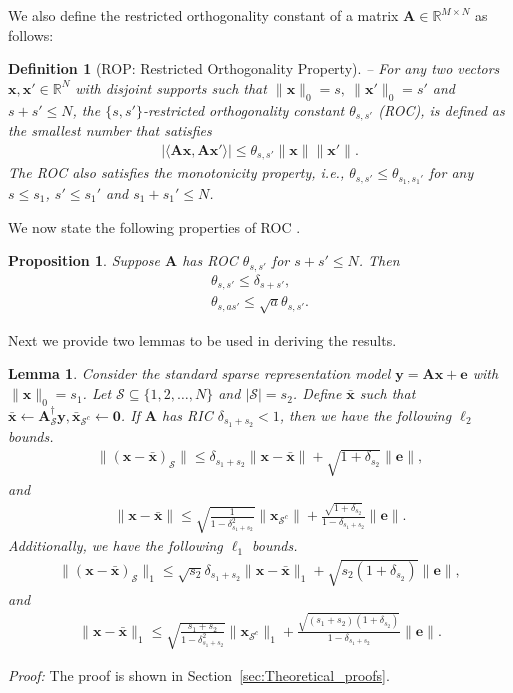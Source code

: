\documentclass[journal]{IEEEtran}
\newcommand{\mbx}{\mathbf{x}}
\newcommand{\mbA}{\mathbf{A}}
\newcommand{\mby}{\mathbf{y}}
\newcommand{\mbe}{\mathbf{e}}
\newtheorem{lemma}{Lemma}
\newtheorem{proposition}{Proposition}
\newtheorem{definition}{Definition}
\begin{document}
We also define the restricted orthogonality constant of a matrix $\mbA \in \mathbb{R}^{M \times N}$ as follows:
\begin{definition}[ROP: Restricted Orthogonality Property\cite{Cai_Shifting_Inequality_TSP_2010}]\label{def:rop} --
For any two vectors $\mbx, \mbx' \in \mathbb{R}^{N}$ with disjoint supports such that $\|\mbx\|_0 = s, \ \|\mbx'\|_0 = s'$ and $s+s' \leq N$, the $\{s,s'\}$-\textit{restricted orthogonality constant} $\theta_{s,s'}$ (ROC), is defined as the smallest number that satisfies 
\begin{align*}
|\langle \mbA\mbx, \mbA\mbx'\rangle| \leq \theta_{s,s'} \|\mbx\| \|\mbx'\|.
\end{align*}
The ROC also satisfies the monotonicity property, i.e., $\theta_{s,s'} \leq \theta_{s_1,s_1'}$ for any $s \leq s_1$, $s' \leq s_1'$ and $s_1+s_1' \leq N$.
\end{definition}
We now state the following properties of ROC \cite{Cai_Shifting_Inequality_TSP_2010}.
\begin{proposition}
Suppose $\mbA$ has ROC $\theta_{s,s'}$ for $s+s' \leq N$. Then
 \begin{subequations}
    \begin{align}
\theta_{s,s'} \leq \delta_{s+s'}, \label{prop1:1} \\
\theta_{s,as'} \leq \sqrt{a} \theta_{s,s'}. \label{prop1:2}
\end{align}
\end{subequations}
\end{proposition}
Next we provide two lemmas to be used in deriving the results.
\begin{lemma}
\label{lem:l1_l2_bound_pruning}
Consider the standard sparse representation model $\mby=\mbA\mbx + \mbe$ with $\|\mbx\|_0 = s_1$. Let $\mathcal{S} \subseteq \{1,2,\hdots,N\}$ and $|\mathcal{S}|=s_2$. Define $\bar{\mbx}$ such that $\bar{\mbx}\leftarrow \mbA_{\mathcal{S}}^\dag \mby, \bar{\mbx}_{\mathcal{S}^c} \leftarrow \mathbf{0}$. If $\mbA$ has RIC $\delta_{s_1+s_2} < 1$, then we have the following $\ell_2$ bounds.
\begin{eqnarray*}
\|\left(\mbx-\bar{\mbx}\right)_{\mathcal{S}}\| \leq \delta_{s_1+s_2} \|\mbx-\bar{\mbx}\| + \sqrt{1+\delta_{s_2}}\|\mbe\|,
\end{eqnarray*}
and
\begin{eqnarray*}
\|\mbx-\bar{\mbx}\| \leq \sqrt{\frac{1}{1-\delta_{s_1+s_2}^2}}\|\mbx_{\mathcal{S}^c}\| + \frac{\sqrt{1+\delta_{s_2}}}{1-\delta_{s_1+s_2}}\|\mbe\|.
\end{eqnarray*}
Additionally, we have the following $\ell_1$ bounds.
\begin{eqnarray*}
\|\left(\mbx-\bar{\mbx}\right)_{\mathcal{S}}\|_1 \leq \sqrt{s_2}\delta_{s_1+s_2} \|\mbx-\bar{\mbx}\|_1 + \sqrt{s_2(1+\delta_{s_2})}\|\mbe\|,
\end{eqnarray*}
and
\begin{eqnarray*}
\|\mbx-\bar{\mbx}\|_1 \leq \sqrt{\frac{s_1+s_2}{1-\delta_{s_1+s_2}^2}}\|\mbx_{\mathcal{S}^c}\|_1 + \frac{\sqrt{(s_1+s_2)(1+\delta_{s_2})}}{1-\delta_{s_1+s_2}}\|\mbe\|.
\end{eqnarray*}
\end{lemma}
\noindent \emph{Proof:} The proof is shown in Section~\ref{sec:Theoretical_proofs}.
\end{document}
